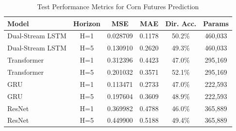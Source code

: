 \begin{table}[htbp]
\centering
\caption{Test Performance Metrics for Corn Futures Prediction}
\label{tab:corn_performance}
\begin{tabular}{lccccc}
\toprule
Model & Horizon & MSE & MAE & Dir. Acc. & Params \\
\midrule
Dual-Stream LSTM & H=1 & 0.028709 & 0.1178 & 50.2\% & 460,033 \\
Dual-Stream LSTM & H=5 & 0.130910 & 0.2620 & 49.3\% & 460,033 \\
Transformer & H=1 & 0.312396 & 0.4423 & 47.0\% & 295,169 \\
Transformer & H=5 & 0.201032 & 0.3571 & 52.1\% & 295,169 \\
GRU & H=1 & 0.113471 & 0.2733 & 47.0\% & 222,593 \\
GRU & H=5 & 0.197604 & 0.3609 & 48.9\% & 222,593 \\
ResNet & H=1 & 0.369982 & 0.4788 & 46.0\% & 365,889 \\
ResNet & H=5 & 0.449900 & 0.5188 & 49.4\% & 365,889 \\
\bottomrule
\end{tabular}
\end{table}

